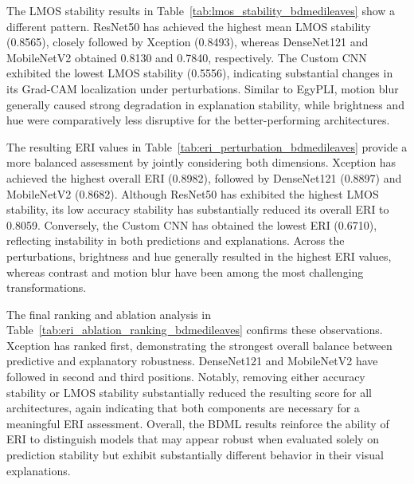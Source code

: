 \documentclass[a4paper,fleqn]{cas-dc}
\begin{document}
The LMOS stability results in Table~\ref{tab:lmos_stability_bdmedileaves} show a different pattern. ResNet50 has achieved the highest mean LMOS stability (0.8565), closely followed by Xception (0.8493), whereas DenseNet121 and MobileNetV2 obtained 0.8130 and 0.7840, respectively. The Custom CNN exhibited the lowest LMOS stability (0.5556), indicating substantial changes in its Grad-CAM localization under perturbations. Similar to EgyPLI, motion blur generally caused strong degradation in explanation stability, while brightness and hue were comparatively less disruptive for the better-performing architectures.

The resulting ERI values in Table~\ref{tab:eri_perturbation_bdmedileaves} provide a more balanced assessment by jointly considering both dimensions. Xception has achieved the highest overall ERI (0.8982), followed by DenseNet121 (0.8897) and MobileNetV2 (0.8682). Although ResNet50 has exhibited the highest LMOS stability, its low accuracy stability has substantially reduced its overall ERI to 0.8059. Conversely, the Custom CNN has obtained the lowest ERI (0.6710), reflecting instability in both predictions and explanations. Across the perturbations, brightness and hue generally resulted in the highest ERI values, whereas contrast and motion blur have been among the most challenging transformations.

The final ranking and ablation analysis in Table~\ref{tab:eri_ablation_ranking_bdmedileaves} confirms these observations. Xception has ranked first, demonstrating the strongest overall balance between predictive and explanatory robustness. DenseNet121 and MobileNetV2 have followed in second and third positions. Notably, removing either accuracy stability or LMOS stability substantially reduced the resulting score for all architectures, again indicating that both components are necessary for a meaningful ERI assessment. Overall, the BDML results reinforce the ability of ERI to distinguish models that may appear robust when evaluated solely on prediction stability but exhibit substantially different behavior in their visual explanations.
\end{document}
